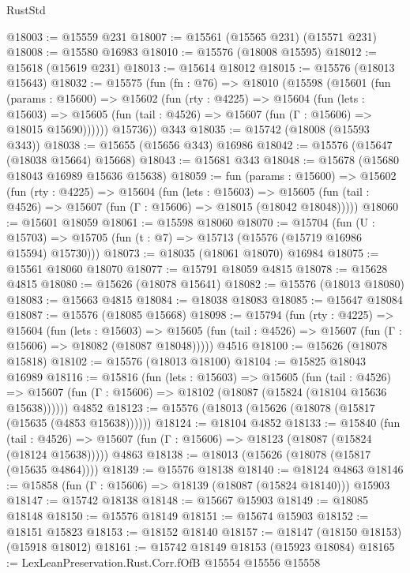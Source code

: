 \begin{lexlean}{RustStd}
\begin{coremodule}
@18003 := @15559 @231
@18007 := @15561 (@15565 @231) (@15571 @231)
@18008 := @15580 @16983
@18010 := @15576 (@18008 @15595)
@18012 := @15618 (@15619 @231)
@18013 := @15614 @18012
@18015 := @15576 (@18013 @15643)
@18032 := @15575
    (fun (fn : @76) =>
    @18010
      (@15598
        (@15601
          (fun (params : @15600) =>
          @15602
            (fun (rty : @4225) =>
            @15604
              (fun (lets : @15603) =>
              @15605 (fun (tail : @4526) => @15607 (fun (Γ : @15606) => @18015 @15690))))))
        @15736))
    @343
@18035 := @15742 (@18008 (@15593 @343))
@18038 := @15655 (@15656 @343) @16986
@18042 := @15576 (@15647 (@18038 @15664) @15668)
@18043 := @15681 @343
@18048 := @15678 (@15680 @18043 @16989 @15636 @15638)
@18059 := fun (params : @15600) =>
  @15602
    (fun (rty : @4225) =>
    @15604
      (fun (lets : @15603) =>
      @15605 (fun (tail : @4526) => @15607 (fun (Γ : @15606) => @18015 (@18042 @18048)))))
@18060 := @15601 @18059
@18061 := @15598 @18060
@18070 := @15704
    (fun (U : @15703) => @15705 (fun (t : @7) => @15713 (@15576 (@15719 @16986 @15594) @15730)))
@18073 := @18035 (@18061 @18070) @16984
@18075 := @15561 @18060 @18070
@18077 := @15791 @18059 @4815
@18078 := @15628 @4815
@18080 := @15626 (@18078 @15641)
@18082 := @15576 (@18013 @18080)
@18083 := @15663 @4815
@18084 := @18038 @18083
@18085 := @15647 @18084
@18087 := @15576 (@18085 @15668)
@18098 := @15794
    (fun (rty : @4225) =>
    @15604
      (fun (lets : @15603) =>
      @15605 (fun (tail : @4526) => @15607 (fun (Γ : @15606) => @18082 (@18087 @18048)))))
    @4516
@18100 := @15626 (@18078 @15818)
@18102 := @15576 (@18013 @18100)
@18104 := @15825 @18043 @16989
@18116 := @15816
    (fun (lets : @15603) =>
    @15605
      (fun (tail : @4526) =>
      @15607 (fun (Γ : @15606) => @18102 (@18087 (@15824 (@18104 @15636 @15638))))))
    @4852
@18123 := @15576 (@18013 (@15626 (@18078 (@15817 (@15635 (@4853 @15638))))))
@18124 := @18104 @4852
@18133 := @15840
    (fun (tail : @4526) => @15607 (fun (Γ : @15606) => @18123 (@18087 (@15824 (@18124 @15638)))))
    @4863
@18138 := @18013 (@15626 (@18078 (@15817 (@15635 @4864))))
@18139 := @15576 @18138
@18140 := @18124 @4863
@18146 := @15858 (fun (Γ : @15606) => @18139 (@18087 (@15824 @18140))) @15903
@18147 := @15742 @18138
@18148 := @15667 @15903
@18149 := @18085 @18148
@18150 := @15576 @18149
@18151 := @15674 @15903
@18152 := @18151 @15823
@18153 := @18152 @18140
@18157 := @18147 (@18150 @18153) (@15918 @18012)
@18161 := @15742 @18149 @18153 (@15923 @18084)
@18165 := LexLeanPreservation.Rust.Corr.fOfB @15554 @15556 @15558

\end{coremodule}
\end{lexlean}
